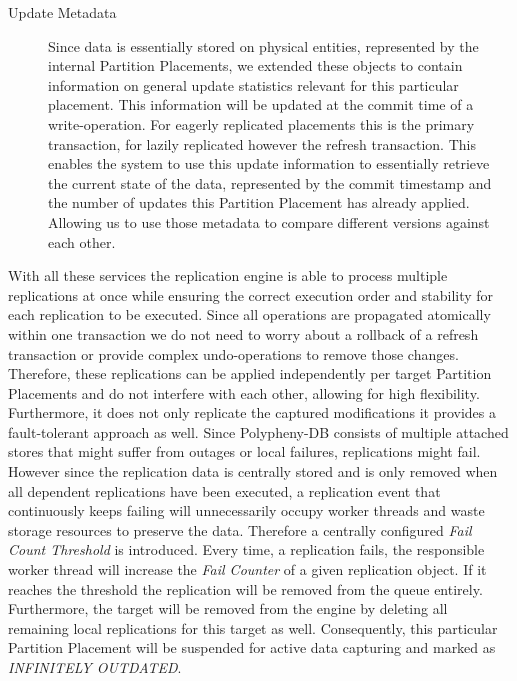 \begin{description}
    \item[Update Metadata] Since data is essentially stored on physical entities, represented by the internal Partition Placements, we extended these objects 
    to contain information on general update statistics relevant for this particular placement. This information will be updated at the commit time of a write-operation.
    For eagerly replicated placements this is the primary transaction, for lazily replicated however the refresh transaction.
    This enables the system to use this update information to essentially retrieve the current state of the data, represented by the commit timestamp
    and the number of updates this Partition Placement has already applied. Allowing us to use those metadata to compare different versions against each other.

\end{description}



With all these services the replication engine is able to process multiple replications at once while ensuring the correct execution order and stability
for each replication to be executed. 
Since all operations are propagated atomically within one transaction we do not need to worry about a rollback of a refresh transaction or provide complex undo-operations 
to remove those changes. Therefore, these replications can be applied independently per target Partition Placements and do not interfere with each other, 
allowing for high flexibility.\\
Furthermore, it does not only replicate the captured modifications it provides a fault-tolerant approach as well. 
Since Polypheny-DB consists of multiple attached stores that might suffer from outages or local failures, replications might fail.
However since the replication data is centrally stored and is only removed when all dependent replications have been executed, 
a replication event that continuously keeps failing will unnecessarily occupy worker threads and waste storage resources to preserve the data.
Therefore a centrally configured \emph{Fail Count Threshold} is introduced. Every time, a replication fails, the responsible worker thread will increase the \textit{Fail Counter} 
of a given replication object. If it reaches the threshold the replication will be removed from the queue entirely. 
Furthermore, the target will be removed from the engine by deleting all remaining local replications for this target as well.
Consequently, this particular Partition Placement will be suspended for active data capturing and marked as \emph{INFINITELY OUTDATED}.

